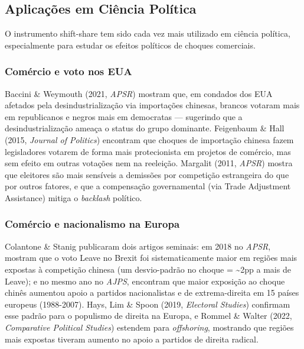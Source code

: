 \documentclass[
]{article}
\begin{document}
\subsection{Aplicações em Ciência Política}\label{aplicauxe7uxf5es-em-ciuxeancia-poluxedtica}

O instrumento shift-share tem sido cada vez mais utilizado em ciência política, especialmente para estudar os efeitos políticos de choques comerciais.

\subsubsection{Comércio e voto nos EUA}\label{comuxe9rcio-e-voto-nos-eua}

Baccini \& Weymouth (2021, \emph{APSR}) mostram que, em condados dos EUA afetados pela desindustrialização via importações chinesas, brancos votaram mais em republicanos e negros mais em democratas --- sugerindo que a desindustrialização ameaça o status do grupo dominante. Feigenbaum \& Hall (2015, \emph{Journal of Politics}) encontram que choques de importação chinesa fazem legisladores votarem de forma mais protecionista em projetos de comércio, mas sem efeito em outras votações nem na reeleição. Margalit (2011, \emph{APSR}) mostra que eleitores são mais sensíveis a demissões por competição estrangeira do que por outros fatores, e que a compensação governamental (via Trade Adjustment Assistance) mitiga o \emph{backlash} político.

\subsubsection{Comércio e nacionalismo na Europa}\label{comuxe9rcio-e-nacionalismo-na-europa}

Colantone \& Stanig publicaram dois artigos seminais: em 2018 no \emph{APSR}, mostram que o voto Leave no Brexit foi sistematicamente maior em regiões mais expostas à competição chinesa (um desvio-padrão no choque = \textasciitilde2pp a mais de Leave); e no mesmo ano no \emph{AJPS}, encontram que maior exposição ao choque chinês aumentou apoio a partidos nacionalistas e de extrema-direita em 15 países europeus (1988-2007). Hays, Lim \& Spoon (2019, \emph{Electoral Studies}) confirmam esse padrão para o populismo de direita na Europa, e Rommel \& Walter (2022, \emph{Comparative Political Studies}) estendem para \emph{offshoring}, mostrando que regiões mais expostas tiveram aumento no apoio a partidos de direita radical.
\end{document}
